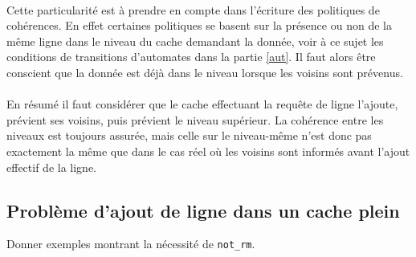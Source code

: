 \paragraph{}
Cette particularité est à prendre en compte dans l'écriture des politiques de cohérences. En effet certaines politiques se basent sur la présence ou non de la même ligne dans le niveau du cache demandant la donnée, voir à ce sujet les conditions de transitions d'automates dans la partie \ref{aut}. Il faut alors être conscient que la donnée est déjà dans le niveau lorsque les voisins sont prévenus.

\paragraph{}
En résumé il faut considérer que le cache effectuant la requête de ligne l'ajoute, prévient ses voisins, puis prévient le niveau supérieur. La cohérence entre les niveaux est toujours assurée, mais celle sur le niveau-même n'est donc pas exactement la même que dans le cas réel où les voisins sont informés avant l'ajout effectif de la ligne.


\subsection{Problème d'ajout de ligne dans un cache plein}


Donner exemples montrant la nécessité de \verb:not_rm:.


